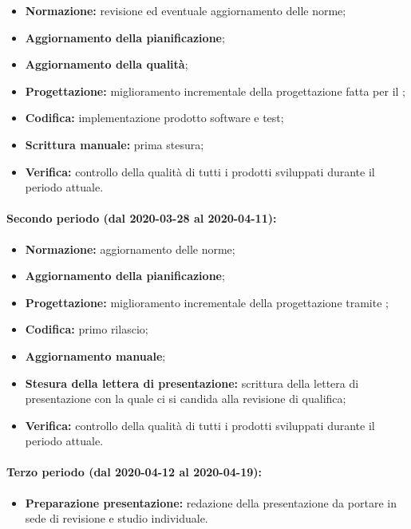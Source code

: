 					\begin{itemize}
						\item \textbf{Normazione:} revisione ed eventuale aggiornamento delle norme;
						\item \textbf{Aggiornamento della pianificazione};
						\item \textbf{Aggiornamento della qualità};
						\item \textbf{Progettazione:} miglioramento incrementale della progettazione fatta per il ;
						\item \textbf{Codifica:} implementazione prodotto software e test;
						\item \textbf{Scrittura manuale:} prima stesura;
						\item \textbf{Verifica:} controllo della qualità di tutti i prodotti sviluppati durante il periodo attuale.
					\end{itemize} 	
				
				\paragraph{Secondo periodo (dal 2020-03-28 al 2020-04-11):}
				
					\begin{itemize}
						\item \textbf{Normazione:} aggiornamento delle norme;
						\item \textbf{Aggiornamento della pianificazione};
						\item \textbf{Progettazione:} miglioramento incrementale della progettazione tramite ;
						\item \textbf{Codifica:} primo rilascio;
						\item \textbf{Aggiornamento manuale};
						\item \textbf{Stesura della lettera di presentazione:} scrittura della lettera di presentazione con la quale ci si candida alla revisione di qualifica;
						\item \textbf{Verifica:} controllo della qualità di tutti i prodotti sviluppati durante il periodo attuale.
					\end{itemize}
		
				\paragraph{Terzo periodo (dal 2020-04-12 al 2020-04-19):}
				
					\begin{itemize}
						\item \textbf{Preparazione presentazione:} redazione della presentazione da portare in sede di revisione e studio individuale.
					\end{itemize}
		
